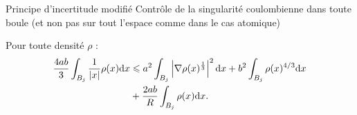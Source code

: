 \documentclass{beamer}
\newcommand{\dd}{\mathrm d}
\renewcommand{\leq}{\leqslant}
\begin{document}
\begin{frame}{Principe d'incertitude modifié}
  Contrôle de la singularité coulombienne dans toute boule (et non pas
  sur tout l'espace comme dans le cas atomique)

    \vspace{1cm}

    Pour toute densité $\rho$ :
    \begin{align*}
      \frac {4ab}{3} \int_{B_j}
       \frac 1 {|x|}\rho(x)\dd x &\leq
      a^2\int_{B_j}\left|\nabla \rho(x)^{\tiny{\frac{1}{3}}}\right|^2 \dd x + b^2 \int_{B_j} \rho(x)^{4/3}\dd x \\&+ \frac{2ab}{R} \int_{B_j}
    \rho(x)\dd x.
    \end{align*}

\end{frame}
\end{document}
